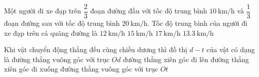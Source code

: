 \begin{ex}
	Một người đi xe đạp trên $\dfrac{2}{3}$ đoạn đường đầu với tốc độ trung bình $\SI{10}{\kilo\meter/\hour}$ và $\dfrac{1}{3}$ đoạn đường sau với tốc độ trung bình $\SI{20}{\kilo\meter/\hour}$. Tốc độ trung bình của người đi xe đạp trên cả quãng đường là
	\choice
	{\True $\SI{12}{\kilo\meter/\hour}$}
	{$\SI{15}{\kilo\meter/\hour}$}
	{$\SI{17}{\kilo\meter/\hour}$}
	{$\SI{13.3}{\kilo\meter/\hour}$}
\end{ex}
\begin{ex}
	Khi vật chuyển động thẳng đều cùng chiều dương thì đồ thị $d - t$ của vật có dạng là
	\choice
	{đường thẳng vuông góc với trục $Od$}
	{\True đường thẳng xiên góc đi lên}
	{đường thẳng xiên góc đi xuống}
	{đường thẳng vuông góc với trục $Ot$}
	\loigiai{}
\end{ex}

\begin{ex}
	\loigiai{}
\end{ex}

